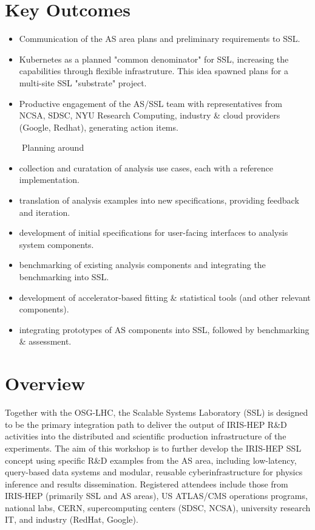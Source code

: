 \documentclass[11pt,letterpaper,fleqn]{article}
\begin{document}
\section*{Key Outcomes}
\vspace{3pt}
\begin{itemize}
  \item Communication of the AS area plans and preliminary requirements to SSL.
  \item Kubernetes as a planned "common denominator" for SSL, increasing the capabilities through flexible infrastruture. This idea spawned plans for a multi-site SSL "substrate" project.
  \item Productive engagement of the AS/SSL team with representatives from NCSA, SDSC, NYU Research Computing, industry \& cloud providers (Google, Redhat), generating action items.
\end{itemize}
\vspace{-5pt}
~~~~Planning around
\vspace{-5pt}
\begin{itemize}
  \item collection and curatation of analysis use cases, each with a reference implementation.
  \item translation of analysis examples into new specifications, providing feedback and iteration.
  \item development of initial specifications for user-facing interfaces to analysis system components.
  \item benchmarking of existing analysis components and integrating the benchmarking into SSL.
  \item development of accelerator-based fitting \& statistical tools (and other relevant components).
  \item integrating prototypes of AS components into SSL, followed by benchmarking \& assessment.
\end{itemize}


\newpage
\thispagestyle{reststyle}

\section{Overview}
Together with the OSG-LHC, the Scalable Systems Laboratory (SSL) is designed to be the primary integration path to deliver the output of IRIS-HEP R\&D activities into the distributed and scientific production infrastructure of the experiments. The aim of this workshop is to further develop the IRIS-HEP SSL concept using specific R\&D examples from the AS area, including  low-latency, query-based data systems and modular, reusable cyberinfrastructure for physics inference and results dissemination. Registered attendees include those from IRIS-HEP (primarily SSL and AS areas), US ATLAS/CMS operations programs, national labs, CERN, supercomputing centers (SDSC, NCSA), university research IT, and industry (RedHat, Google).
\end{document}
